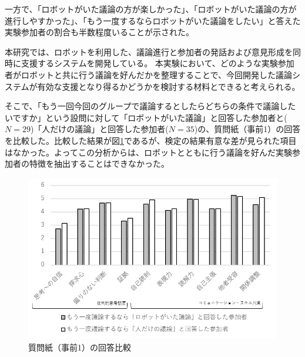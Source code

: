 \documentclass[11pt, a4paper]{jreport} %
\begin{document}
一方で、「ロボットがいた議論の方が楽しかった」、「ロボットがいた議論の方が進行しやすかった」、「もう一度するならロボットがいた議論をしたい」と答えた実験参加者の割合も半数程度いることが示された。


本研究では、ロボットを利用した、議論進行と参加者の発話および意見形成を同時に支援するシステムを開発している。
本実験において、どのような実験参加者がロボットと共に行う議論を好んだかを整理することで、今回開発した議論システムが有効な支援となり得るかどうかを検討する材料とできると考えられる。


そこで、「もう一回今回のグループで議論するとしたらどちらの条件で議論したいですか」という設問に対して「ロボットがいた議論」と回答した参加者と($N=29$)「人だけの議論」と回答した参加者($N=35$)の、質問紙（事前1）の回答を比較した。比較した結果が図\ref{fig:jikken3_seikaku}であるが、検定の結果有意な差が見られた項目はなかった。よってこの分析からは、ロボットとともに行う議論を好んだ実験参加者の特徴を抽出することはできなかった。


\begin{figure}[htbp]
\begin{center}
\includegraphics[width=150mm]{images/jikken3_seikaku.png}
\caption{質問紙（事前1）の回答比較}
\label{fig:jikken3_seikaku}
\end{center}
\end{figure}
\end{document}
